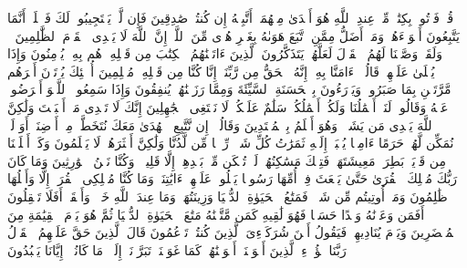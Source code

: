 \startbuffer[\q:28:49]
قُلۡ فَأۡتُوا۟ بِكِتَٰبࣲ مِّنۡ عِندِ ٱللَّهِ هُوَ أَهۡدَىٰ مِنۡهُمَاۤ أَتَّبِعۡهُ إِن كُنتُمۡ صَٰدِقِینَ%
\stopbuffer
\startbuffer[\q:28:50]
فَإِن لَّمۡ یَسۡتَجِیبُوا۟ لَكَ فَٱعۡلَمۡ أَنَّمَا یَتَّبِعُونَ أَهۡوَاۤءَهُمۡۚ وَمَنۡ أَضَلُّ مِمَّنِ ٱتَّبَعَ هَوَىٰهُ بِغَیۡرِ هُدࣰى مِّنَ ٱللَّهِۚ إِنَّ ٱللَّهَ لَا یَهۡدِی ٱلۡقَوۡمَ ٱلظَّٰلِمِینَ%
\stopbuffer
\startbuffer[\q:28:51]
۞ وَلَقَدۡ وَصَّلۡنَا لَهُمُ ٱلۡقَوۡلَ لَعَلَّهُمۡ یَتَذَكَّرُونَ%
\stopbuffer
\startbuffer[\q:28:52]
ٱلَّذِینَ ءَاتَیۡنَٰهُمُ ٱلۡكِتَٰبَ مِن قَبۡلِهِۦ هُم بِهِۦ یُؤۡمِنُونَ%
\stopbuffer
\startbuffer[\q:28:53]
وَإِذَا یُتۡلَىٰ عَلَیۡهِمۡ قَالُوۤا۟ ءَامَنَّا بِهِۦۤ إِنَّهُ ٱلۡحَقُّ مِن رَّبِّنَاۤ إِنَّا كُنَّا مِن قَبۡلِهِۦ مُسۡلِمِینَ%
\stopbuffer
\startbuffer[\q:28:54]
أُو۟لَٰۤئِكَ یُؤۡتَوۡنَ أَجۡرَهُم مَّرَّتَیۡنِ بِمَا صَبَرُوا۟ وَیَدۡرَءُونَ بِٱلۡحَسَنَةِ ٱلسَّیِّئَةَ وَمِمَّا رَزَقۡنَٰهُمۡ یُنفِقُونَ%
\stopbuffer
\startbuffer[\q:28:55]
وَإِذَا سَمِعُوا۟ ٱللَّغۡوَ أَعۡرَضُوا۟ عَنۡهُ وَقَالُوا۟ لَنَاۤ أَعۡمَٰلُنَا وَلَكُمۡ أَعۡمَٰلُكُمۡ سَلَٰمٌ عَلَیۡكُمۡ لَا نَبۡتَغِی ٱلۡجَٰهِلِینَ%
\stopbuffer
\startbuffer[\q:28:56]
إِنَّكَ لَا تَهۡدِی مَنۡ أَحۡبَبۡتَ وَلَٰكِنَّ ٱللَّهَ یَهۡدِی مَن یَشَاۤءُۚ وَهُوَ أَعۡلَمُ بِٱلۡمُهۡتَدِینَ%
\stopbuffer
\startbuffer[\q:28:57]
وَقَالُوۤا۟ إِن نَّتَّبِعِ ٱلۡهُدَىٰ مَعَكَ نُتَخَطَّفۡ مِنۡ أَرۡضِنَاۤۚ أَوَ لَمۡ نُمَكِّن لَّهُمۡ حَرَمًا ءَامِنࣰا یُجۡبَىٰۤ إِلَیۡهِ ثَمَرَٰتُ كُلِّ شَیۡءࣲ رِّزۡقࣰا مِّن لَّدُنَّا وَلَٰكِنَّ أَكۡثَرَهُمۡ لَا یَعۡلَمُونَ%
\stopbuffer
\startbuffer[\q:28:58]
وَكَمۡ أَهۡلَكۡنَا مِن قَرۡیَةِۭ بَطِرَتۡ مَعِیشَتَهَاۖ فَتِلۡكَ مَسَٰكِنُهُمۡ لَمۡ تُسۡكَن مِّنۢ بَعۡدِهِمۡ إِلَّا قَلِیلࣰاۖ وَكُنَّا نَحۡنُ ٱلۡوَٰرِثِینَ%
\stopbuffer
\startbuffer[\q:28:59]
وَمَا كَانَ رَبُّكَ مُهۡلِكَ ٱلۡقُرَىٰ حَتَّىٰ یَبۡعَثَ فِیۤ أُمِّهَا رَسُولࣰا یَتۡلُوا۟ عَلَیۡهِمۡ ءَایَٰتِنَاۚ وَمَا كُنَّا مُهۡلِكِی ٱلۡقُرَىٰۤ إِلَّا وَأَهۡلُهَا ظَٰلِمُونَ%
\stopbuffer
\startbuffer[\q:28:60]
وَمَاۤ أُوتِیتُم مِّن شَیۡءࣲ فَمَتَٰعُ ٱلۡحَیَوٰةِ ٱلدُّنۡیَا وَزِینَتُهَاۚ وَمَا عِندَ ٱللَّهِ خَیۡرࣱ وَأَبۡقَىٰۤۚ أَفَلَا تَعۡقِلُونَ%
\stopbuffer
\startbuffer[\q:28:61]
أَفَمَن وَعَدۡنَٰهُ وَعۡدًا حَسَنࣰا فَهُوَ لَٰقِیهِ كَمَن مَّتَّعۡنَٰهُ مَتَٰعَ ٱلۡحَیَوٰةِ ٱلدُّنۡیَا ثُمَّ هُوَ یَوۡمَ ٱلۡقِیَٰمَةِ مِنَ ٱلۡمُحۡضَرِینَ%
\stopbuffer
\startbuffer[\q:28:62]
وَیَوۡمَ یُنَادِیهِمۡ فَیَقُولُ أَیۡنَ شُرَكَاۤءِیَ ٱلَّذِینَ كُنتُمۡ تَزۡعُمُونَ%
\stopbuffer
\startbuffer[\q:28:63]
قَالَ ٱلَّذِینَ حَقَّ عَلَیۡهِمُ ٱلۡقَوۡلُ رَبَّنَا هَٰۤؤُلَاۤءِ ٱلَّذِینَ أَغۡوَیۡنَاۤ أَغۡوَیۡنَٰهُمۡ كَمَا غَوَیۡنَاۖ تَبَرَّأۡنَاۤ إِلَیۡكَۖ مَا كَانُوۤا۟ إِیَّانَا یَعۡبُدُونَ%
